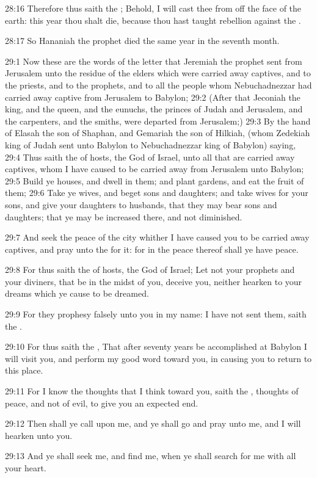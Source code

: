 28:16 Therefore thus saith the \LORD; Behold, I will cast thee from off the face of the earth: this year thou shalt die, because thou hast taught rebellion against the \LORD.

28:17 So Hananiah the prophet died the same year in the seventh month.

29:1 Now these are the words of the letter that Jeremiah the prophet sent from Jerusalem unto the residue of the elders which were carried away captives, and to the priests, and to the prophets, and to all the people whom Nebuchadnezzar had carried away captive from Jerusalem to Babylon; 29:2 (After that Jeconiah the king, and the queen, and the eunuchs, the princes of Judah and Jerusalem, and the carpenters, and the smiths, were departed from Jerusalem;) 29:3 By the hand of Elasah the son of Shaphan, and Gemariah the son of Hilkiah, (whom Zedekiah king of Judah sent unto Babylon to Nebuchadnezzar king of Babylon) saying, 29:4 Thus saith the \LORD of hosts, the God of Israel, unto all that are carried away captives, whom I have caused to be carried away from Jerusalem unto Babylon; 29:5 Build ye houses, and dwell in them; and plant gardens, and eat the fruit of them; 29:6 Take ye wives, and beget sons and daughters; and take wives for your sons, and give your daughters to husbands, that they may bear sons and daughters; that ye may be increased there, and not diminished.

29:7 And seek the peace of the city whither I have caused you to be carried away captives, and pray unto the \LORD for it: for in the peace thereof shall ye have peace.

29:8 For thus saith the \LORD of hosts, the God of Israel; Let not your prophets and your diviners, that be in the midst of you, deceive you, neither hearken to your dreams which ye cause to be dreamed.

29:9 For they prophesy falsely unto you in my name: I have not sent them, saith the \LORD.

29:10 For thus saith the \LORD, That after seventy years be accomplished at Babylon I will visit you, and perform my good word toward you, in causing you to return to this place.

29:11 For I know the thoughts that I think toward you, saith the \LORD, thoughts of peace, and not of evil, to give you an expected end.

29:12 Then shall ye call upon me, and ye shall go and pray unto me, and I will hearken unto you.

29:13 And ye shall seek me, and find me, when ye shall search for me with all your heart.

